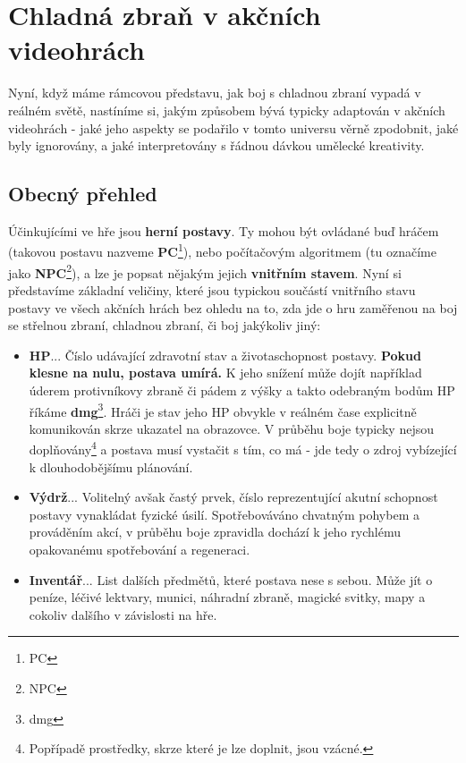 \section{Chladná zbraň v akčních videohrách}

Nyní, když máme rámcovou představu, jak boj s chladnou zbraní vypadá v reálném světě, nastíníme si, jakým způsobem bývá typicky adaptován v akčních videohrách - jaké jeho aspekty se podařilo v tomto universu věrně zpodobnit, jaké byly ignorovány, a jaké interpretovány s řádnou dávkou umělecké kreativity.

\subsection{Obecný přehled}

Účinkujícími ve hře jsou \textbf{herní postavy}. Ty mohou být ovládané buď hráčem (takovou postavu nazveme \textbf{\acs{PC}}\footnote{\Acl{PC}}), nebo počítačovým algoritmem (tu označíme jako \textbf{\acs{NPC}}\footnote{\Acl{NPC}}), a lze je popsat nějakým jejich \textbf{vnitřním stavem}. Nyní si představíme základní veličiny, které jsou typickou součástí vnitřního stavu postavy ve všech akčních hrách bez ohledu na to, zda jde o hru zaměřenou na boj se střelnou zbraní, chladnou zbraní, či boj jakýkoliv jiný:

\begin{itemize}
    \item \textbf{\ac{HP}}... Číslo udávající zdravotní stav a životaschopnost postavy. \textbf{Pokud klesne na nulu, postava umírá.} K jeho snížení může dojít například úderem protivníkovy zbraně či pádem z výšky a takto odebraným bodům HP říkáme \textbf{\acs{dmg}}\footnote{\Acl{dmg}}. Hráči je stav jeho HP obvykle v reálném čase explicitně komunikován skrze ukazatel na obrazovce. V průběhu boje typicky nejsou doplňovány\footnote{Popřípadě prostředky, skrze které je lze doplnit, jsou vzácné.} a postava musí vystačit s tím, co má - jde tedy o zdroj vybízející k dlouhodobějšímu plánování.
    \item \textbf{Výdrž}... Volitelný avšak častý prvek, číslo reprezentující akutní schopnost postavy vynakládat fyzické úsilí. Spotřebováváno chvatným pohybem a prováděním akcí, v průběhu boje zpravidla dochází k jeho rychlému opakovanému spotřebování a regeneraci.
    \item \textbf{Inventář}... List dalších předmětů, které postava nese s sebou. Může jít o peníze, léčivé lektvary, munici, náhradní zbraně, magické svitky, mapy a cokoliv dalšího v závislosti na hře. 
\end{itemize}

